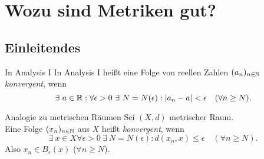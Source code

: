 \chapter{Wozu sind Metriken gut?}

\section{Einleitendes}

\begin{bla}{In Analysis I}
  In Analysis I heißt eine Folge von reellen Zahlen $ (a_n)_{n \in \mathbb{N}} $ \emph{konvergent}, wenn
  \begin{equation*}
    \exists \ a \in \mathbb{R} : \forall \epsilon > 0 \ \exists \ N = N(\epsilon) : \vert a_n - a \vert < \epsilon \quad (\forall n \geq N)\text{.}
  \end{equation*}
\end{bla}

\begin{bla}{Analogie zu metrischen Räumen}
  Sei $ (X, d) $ metrischer Raum. \\
  Eine Folge $ (x_n)_{n \in \mathbb{N}} $ aus $ X $ heißt \emph{konvergent}, wenn
  \begin{equation*}
    \exists \ x \in X \forall \epsilon > 0 \ \exists \ N = N(\epsilon) : d(x_n, x) \leq \epsilon \quad (\forall n \geq N)\text{.}
  \end{equation*}
  Also $ x_n \in B_\epsilon(x) $ ($ \forall n \geq N $).
\end{bla}